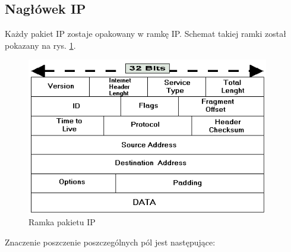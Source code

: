 		\subsection{Nagłówek IP}
			Każdy pakiet IP zostaje opakowany w ramkę IP.
			Schemat takiej ramki został pokazany na rys. \ref{fig:ramka_ip}.
			\begin{figure}[h]
				\centering
				\includegraphics[width=400px]{ip.png}
				\caption{Ramka pakietu IP}
				\label{fig:ramka_ip}
			\end{figure}
			Znaczenie poszczenie poszczególnych pól jest następujące:

